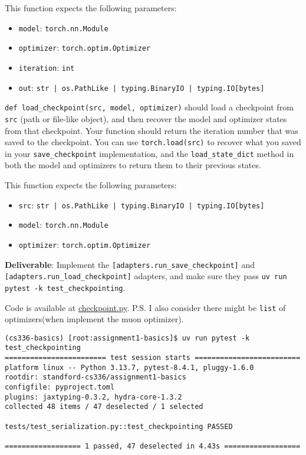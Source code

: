 This function expects the following parameters:
\begin{itemize}
    \item \texttt{model}: \texttt{torch.nn.Module}
    \item \texttt{optimizer}: \texttt{torch.optim.Optimizer}
    \item \texttt{iteration}: \texttt{int}
    \item \texttt{out}: \texttt{str | os.PathLike | typing.BinaryIO | typing.IO[bytes]}
\end{itemize}

\texttt{def load\_checkpoint(src, model, optimizer)} should load a checkpoint from \texttt{src} (path or file-like object), and then recover the model and optimizer states from that checkpoint. Your function should return the iteration number that was saved to the checkpoint. You can use \texttt{torch.load(src)} to recover what you saved in your \texttt{save\_checkpoint} implementation, and the \texttt{load\_state\_dict} method in both the model and optimizers to return them to their previous states.

This function expects the following parameters:
\begin{itemize}
    \item \texttt{src}: \texttt{str | os.PathLike | typing.BinaryIO | typing.IO[bytes]}
    \item \texttt{model}: \texttt{torch.nn.Module}
    \item \texttt{optimizer}: \texttt{torch.optim.Optimizer}
\end{itemize}

\textbf{Deliverable}: Implement the \lstinline{[adapters.run_save_checkpoint]} and \lstinline{[adapters.run_load_checkpoint]} adapters, and make sure they pass \lstinline{uv run pytest -k test_checkpointing}.

\begin{answer}
Code is available at \href{https://github.com/donglinkang2021/cs336-assignment1-basics/blob/main/cs336_basics/checkpoint.py}{checkpoint.py}. P.S. I also consider there might be \lstinline{list} of optimizers(when implement the muon optimizer).
\end{answer}

\begin{lstlisting}
(cs336-basics) [root:assignment1-basics]$ uv run pytest -k test_checkpointing
======================== test session starts =========================
platform linux -- Python 3.13.7, pytest-8.4.1, pluggy-1.6.0
rootdir: standford-cs336/assignment1-basics
configfile: pyproject.toml
plugins: jaxtyping-0.3.2, hydra-core-1.3.2
collected 48 items / 47 deselected / 1 selected                      

tests/test_serialization.py::test_checkpointing PASSED

================== 1 passed, 47 deselected in 4.43s ==================
\end{lstlisting}

